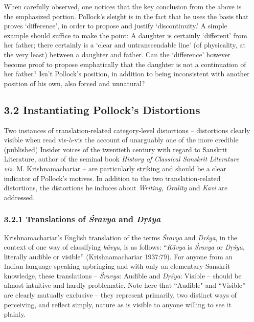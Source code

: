 \vskip 4pt

When carefully observed, one notices that the key conclusion from the above is the emphasized portion. Pollock’s sleight is in the fact that he uses the basis that proves ‘difference’, in order to propose and justify ‘discontinuity.’ A simple example should suffice to make the point: A daughter is certainly ‘different’ from her father; there certainly is a ‘clear and untranscendable line’ (of physicality, at the very least) between a daughter and father. Can the ‘difference’ however become proof to propose emphatically that the daughter is not a continuation of her father? Isn’t Pollock’s position, in addition to being inconsistent with another position of his own, also forced and unnatural?


\subsection*{3.2 Instantiating Pollock’s Distortions}

Two instances of translation-related category-level distortions – distortions clearly visible when read vis-à-vis the account of unarguably one of the more credible (published) Insider voices of the twentieth century with regard to Sanskrit Literature, author of the seminal book \textit{History of Classical Sanskrit Literature viz.} M. Krishnamachariar – are particularly striking and should be a clear indicator of Pollock’s motives. In addition to the two translation-related distortions, the distortions he induces about \textit{Writing, Orality} and \textit{Kavi} are addressed.

\subsubsection*{3.2.1 Translations of \textit{Śravya} and \textit{Dṛśya}}

Krishnamachariar’s English translation of the terms \textit{Śravya} and \textit{Dṛśya}, in the context of one way of classifying \textit{kāvya}, is as follows: “\textit{Kāvya} is \textit{Śravya} or \textit{Dṛśya}, literally audible or visible” (Krishnamachariar 1937:79). For anyone from an Indian language speaking upbringing and with only an elementary Sanskrit knowledge, these translations – \textit{Śravya}: Audible and \textit{Dṛśya}: Visible – should be almost intuitive and hardly problematic. Note here that “Audible" and “Visible” are clearly mutually exclusive – they represent primarily, two distinct ways of perceiving, and reflect simply, nature as is visible to anyone willing to see it plainly.

